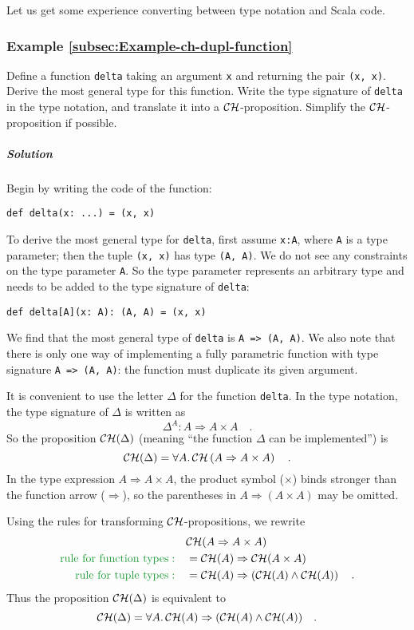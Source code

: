 Let us get some experience converting between type notation and Scala
code.

\subsubsection{Example \label{subsec:Example-ch-dupl-function}\ref{subsec:Example-ch-dupl-function}}

Define a function \lstinline!delta! taking an argument \lstinline!x!
and returning the pair \lstinline!(x, x)!. Derive the most general
type for this function. Write the type signature of \lstinline!delta!
in the type notation, and translate it into a ${\cal CH}$-proposition.
Simplify the ${\cal CH}$-proposition if possible.

\subparagraph{Solution}

Begin by writing the code of the function:
\begin{lstlisting}
def delta(x: ...) = (x, x)
\end{lstlisting}
To derive the most general type for \lstinline!delta!, first assume
\lstinline!x:A!, where \lstinline!A! is a type parameter; then the
tuple \lstinline!(x, x)! has type \lstinline!(A, A)!. We do not
see any constraints on the type parameter \lstinline!A!. So the type
parameter represents an arbitrary type and needs to be added to the
type signature of \lstinline!delta!:
\begin{lstlisting}
def delta[A](x: A): (A, A) = (x, x)
\end{lstlisting}
We find that the most general type of \lstinline!delta! is \lstinline!A => (A, A)!.
We also note that there is only one way of implementing a fully parametric
function with type signature \lstinline!A => (A, A)!: the function
must duplicate its given argument.

It is convenient to use the letter $\Delta$ for the function \lstinline!delta!.
In the type notation, the type signature of $\Delta$ is written as
\[
\Delta^{A}:A\Rightarrow A\times A\quad.
\]
So the proposition ${\cal CH}(\Delta)$ (meaning ``the function $\Delta$
can be implemented'') is
\[
{\cal CH}(\Delta)=\forall A.{\cal \,CH}\left(A\Rightarrow A\times A\right)\quad.
\]
In the type expression $A\Rightarrow A\times A$, the product symbol
($\times$) binds stronger than the function arrow ($\Rightarrow$),
so the parentheses in $A\Rightarrow\left(A\times A\right)$ may be
omitted.

Using the rules for transforming ${\cal CH}$-propositions, we rewrite
\begin{align*}
 & {\cal CH}(A\Rightarrow A\times A)\\
{\color{greenunder}\text{rule for function types}:}\quad & ={\cal CH}(A)\Rightarrow{\cal CH}(A\times A)\\
{\color{greenunder}\text{rule for tuple types}:}\quad & ={\cal CH}(A)\Rightarrow\left({\cal CH}(A)\wedge{\cal CH}(A)\right)\quad.
\end{align*}
Thus the proposition ${\cal CH}(\Delta)$ is equivalent to
\[
{\cal CH}(\Delta)=\forall A.\,{\cal CH}(A)\Rightarrow({\cal CH}(A)\wedge{\cal CH}(A))\quad.
\]


